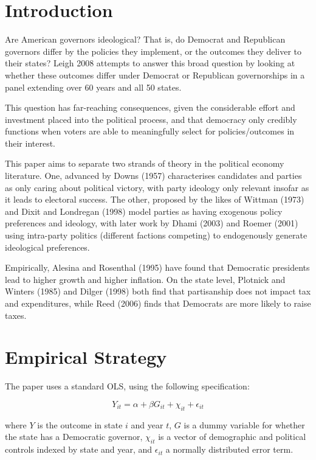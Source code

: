\documentclass{article}
\begin{document}
\section{Introduction}

Are American governors ideological? That is, do Democrat and Republican governors differ by the policies they implement, or the outcomes they deliver to their states? Leigh 2008 attempts to answer this broad question by looking at whether these outcomes differ under Democrat or Republican governorships in a panel extending over 60 years and all 50 states. 

This question has far-reaching consequences, given the considerable effort and investment placed into the political process, and that democracy only credibly functions when voters are able to meaningfully select for policies/outcomes in their interest.

This paper aims to separate two strands of theory in the political economy literature. One, advanced by Downs (1957) characterises candidates and parties as only caring about political victory, with party ideology only relevant insofar as it leads to electoral success. The other, proposed by the likes of Wittman (1973) and Dixit and Londregan (1998) model parties as having exogenous policy preferences and ideology, with later work by Dhami (2003) and Roemer (2001) using intra-party politics (different factions competing) to endogenously generate ideological preferences.

Empirically, Alesina and Rosenthal (1995) have found that Democratic presidents lead to higher growth and higher inflation. On the state level, Plotnick and Winters (1985) and Dilger (1998) both find that partisanship does not impact tax and expenditures, while Reed (2006) finds that Democrats are more likely to raise taxes.


\section{Empirical Strategy}

The paper uses a standard OLS, using the following specification:

\[ Y_{it} = \alpha + \beta G_{it} + \chi_{it} + \epsilon_{it} \]

where $Y$ is the outcome in state $i$ and year $t$, $G$ is a dummy variable for whether the state has a Democratic governor, $\chi_{it}$ is a vector of demographic and political controls indexed by state and year, and $\epsilon_{it}$ a normally distributed error term. \\
\end{document}
